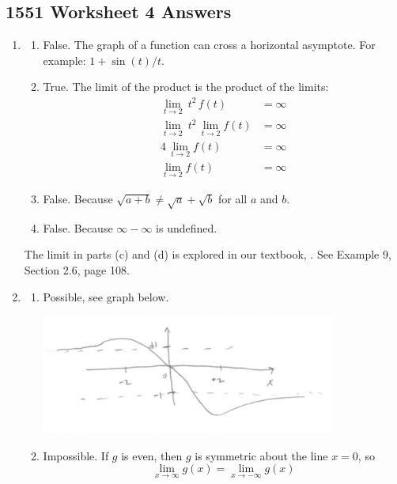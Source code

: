\newpage\subsection*{1551 Worksheet 4 Answers}

\SolutionsStatement

\begin{enumerate}
    
    \item \begin{enumerate} 
    	\item False. The graph of a function can cross a horizontal asymptote. For example: $1+\sin(t)/t$. 
    	\item True. The limit of the product is the product of the limits:
        \begin{align*}
        	\lim_{t\rightarrow 2} \ t^2 \, f(t) &= \infty\\
            \lim_{t\rightarrow 2} \ t^2 \, \lim_{t\rightarrow 2} f(t) &= \infty\\
            4 \, \lim_{t\rightarrow 2} f(t) &= \infty\\
            \lim_{t\rightarrow 2} f(t) &= \infty
        \end{align*}
        \item False. Because $\sqrt{a+b} \ne \sqrt{a} + \sqrt{b}$ for all $a$ and $b$.
        \item False. Because $\infty - \infty$ is undefined. 
    \end{enumerate}
    The limit in parts (c) and (d) is explored in our textbook, \Textbook. See Example 9, Section 2.6, page 108. 
    
    \item \begin{enumerate}
    	\item Possible, see graph below. 
		\begin{center}
			\includegraphics[width=0.8\textwidth]{images/imgWS4Spring17.png} 
		\end{center}
    
        \item Impossible. If $g$ is even, then $g$ is symmetric about the line $x=0$, so 
        $$\lim_{x\rightarrow\infty} g(x) = \lim_{x\rightarrow-\infty} g(x)$$
    \end{enumerate}    
    

\end{enumerate}
